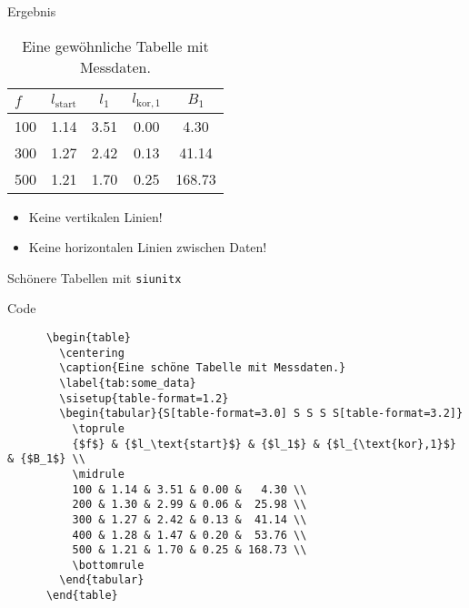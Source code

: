 \begin{frame}{Ergebnis}
  \begin{table}
    \centering
    \caption{Eine gewöhnliche Tabelle mit Messdaten.}
    \begin{tabular}{l c c c c}
      \toprule
      $f$ & $l_\text{start}$ & $l_1$ & $l_{\text{kor},1}$ & $B_1$ \\
      \midrule
      100 & 1.14 & 3.51 & 0.00 &   4.30 \\
      300 & 1.27 & 2.42 & 0.13 &  41.14 \\
      500 & 1.21 & 1.70 & 0.25 & 168.73 \\
      \toprule
    \end{tabular}
  \end{table}
  \begin{itemize}
    \item Keine vertikalen Linien!
    \item Keine horizontalen Linien zwischen Daten!
  \end{itemize}
\end{frame}

\begin{frame}[fragile]{Schönere Tabellen mit \texttt{siunitx}}
  \fontsize{8}{6}
  \begin{block}{Code}
    \begin{lstlisting}
      \begin{table}
        \centering
        \caption{Eine schöne Tabelle mit Messdaten.}
        \label{tab:some_data}
        \sisetup{table-format=1.2}
        \begin{tabular}{S[table-format=3.0] S S S S[table-format=3.2]}
          \toprule
          {$f$} & {$l_\text{start}$} & {$l_1$} & {$l_{\text{kor},1}$} & {$B_1$} \\
          \midrule
          100 & 1.14 & 3.51 & 0.00 &   4.30 \\
          200 & 1.30 & 2.99 & 0.06 &  25.98 \\
          300 & 1.27 & 2.42 & 0.13 &  41.14 \\
          400 & 1.28 & 1.47 & 0.20 &  53.76 \\
          500 & 1.21 & 1.70 & 0.25 & 168.73 \\
          \bottomrule
        \end{tabular}
      \end{table}
    \end{lstlisting}
  \end{block}
\end{frame}

